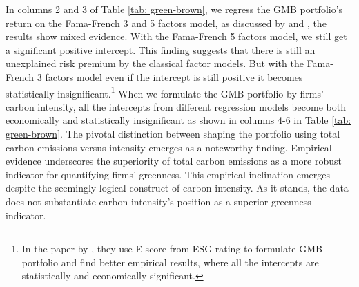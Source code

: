 \documentclass[12pt]{article}
\begin{document}
In columns 2 and 3 of Table \ref{tab: green-brown}, we regress the GMB portfolio's return on the Fama-French 3 and 5 factors model, as discussed by \cite{fama2015five} and \cite{fama1993common}, the results show mixed evidence. With the Fama-French 5 factors model, we still get a significant positive intercept. This finding suggests that there is still an unexplained risk premium by the classical factor models. But with the Fama-French 3 factors model even if the intercept is still positive it becomes statistically insignificant.\footnote{In the paper by \cite{pastor2022dissecting}, they use E score from ESG rating to formulate GMB portfolio and find better empirical results, where all the intercepts are statistically and economically significant.} When we formulate the GMB portfolio by firms' carbon intensity, all the intercepts from different regression models become both economically and statistically insignificant as shown in columns 4-6 in Table \ref{tab: green-brown}. The pivotal distinction between shaping the portfolio using total carbon emissions versus intensity emerges as a noteworthy finding. Empirical evidence underscores the superiority of total carbon emissions as a more robust indicator for quantifying firms' greenness. This empirical inclination emerges despite the seemingly logical construct of carbon intensity. As it stands, the data does not substantiate carbon intensity's position as a superior greenness indicator.
\end{document}
